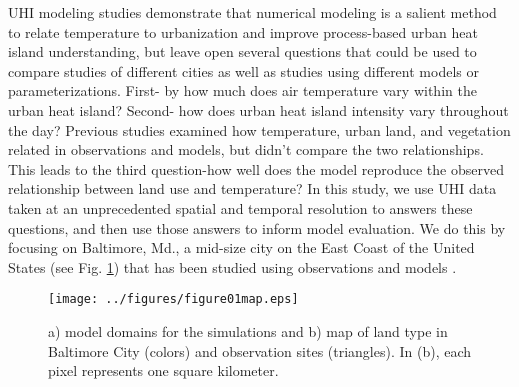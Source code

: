 \documentclass[draft,linenumbers]{agujournal}
\begin{document}
UHI modeling studies demonstrate that numerical modeling is a salient method to relate temperature to urbanization and improve process-based urban heat island understanding, but leave open several questions that could be used to compare studies of different cities as well as studies using different models or parameterizations.
 First- by how much does air temperature vary within the urban heat island? Second- how does urban heat island intensity vary throughout the day? Previous studies examined how temperature, urban land, and vegetation related in observations and models, but didn't compare the two relationships. This leads to the third question-how well does the model reproduce the observed relationship between land use and temperature? 
 In this study, %
 we use UHI data taken at an unprecedented spatial and temporal resolution to answers these questions, and then use those answers to inform model evaluation. %
We do this by focusing on Baltimore, Md., a mid-size city on the East Coast of the United States (see Fig. \ref{fig:map}) that has been studied using observations \citep{Huang20111753,scott2017intraurban, scott2018reduced,brazel2000tale} and models \citep{zhang2011impact,li2013development,li2013synergistic,li2015contrasting}.  

\begin{figure}[h]
\centering
\texttt{[image: ../figures/figure01map.eps]}
\caption{a) model domains for the simulations and b) map of land type in Baltimore City (colors) and observation sites (triangles). In (b), each pixel represents one square kilometer.}
\label{fig:map}
 \end{figure}
 
\end{document}
